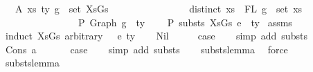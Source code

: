 \begin{isabellebody}
\ \ \ A{}{\isacharcolon}{\kern0pt}\ {\isachardoublequoteopen}{\isasymforall}{\isacharparenleft}{\kern0pt}{\isacharparenleft}{\kern0pt}xs{\isacharcomma}{\kern0pt}\ ty{\isacharparenright}{\kern0pt}{\isacharcomma}{\kern0pt}\ g{\isacharparenright}{\kern0pt}\ {\isasymin}\ set\ XsGs{\isachardot}{\kern0pt}\ {\isacharparenleft}{\kern0pt}\isanewline
\ \ \ \ \ \ \ \ \ \ \ \ \ \ \ distinct\ xs\ {\isasymand}\ FL\ g\ {\isacharequal}{\kern0pt}\ set\ xs\ {\isasymand}\isanewline
\ \ \ \ \ \ \ \ \ \ \ \ \ \ \ {\isacharbrackleft}{\kern0pt}{\isacharbrackright}{\kern0pt}\ {\isasymturnstile}{\isacharbraceleft}{\kern0pt}P{\isacharbraceright}{\kern0pt}\ Graph\ g\ {\isacharcolon}{\kern0pt}\ ty{\isacharparenright}{\kern0pt}{\isachardoublequoteclose}\isanewline
\ \ \ {\isachardoublequoteopen}{\isasymGamma}{}\ {\isasymturnstile}{\isacharbraceleft}{\kern0pt}P{\isacharbraceright}{\kern0pt}\ substs\ XsGs\ e{}\ {\isacharcolon}{\kern0pt}\ ty{}{\isachardoublequoteclose}\isanewline
%
\isadelimproof
%
\endisadelimproof
%
\isatagproof
{}\isamarkupfalse%
\ assms\isanewline
{}\isamarkupfalse%
\ {\isacharparenleft}{\kern0pt}induct\ XsGs\ arbitrary{\isacharcolon}{\kern0pt}\ {\isasymGamma}\ {\isasymGamma}{}\ e{}\ ty{}{\isacharparenright}{\kern0pt}\isanewline
\ \ \isamarkupfalse%
\ Nil\isanewline
\ \ \isamarkupfalse%
\ \isamarkupfalse%
\ {\isacharquery}{\kern0pt}case\isanewline
\ \ \isamarkupfalse%
\ {\isacharparenleft}{\kern0pt}simp\ add{\isacharcolon}{\kern0pt}\ substs{\isacharparenright}{\kern0pt}\isanewline
{}\isamarkupfalse%
\isanewline
\ \ \isamarkupfalse%
\ {\isacharparenleft}{\kern0pt}Cons\ a\ {\isasymGamma}{\isacharparenright}{\kern0pt}\isanewline
\ \ \isamarkupfalse%
\ \isamarkupfalse%
\ {\isacharquery}{\kern0pt}case\isanewline
\ \ \isamarkupfalse%
\ {\isacharparenleft}{\kern0pt}simp\ add{\isacharcolon}{\kern0pt}\ substs{\isacharparenright}{\kern0pt}\isanewline
\ \ \isamarkupfalse%
\ substs{\isacharunderscore}{\kern0pt}lemma{}\ \isamarkupfalse%
\ force\isanewline
{}\isamarkupfalse%
%
\endisatagproof
{\isafoldproof}%
%
\isadelimproof
\isanewline
%
\endisadelimproof
\isanewline
\isanewline
{}\isamarkupfalse%
\ substs{\isacharunderscore}{\kern0pt}lemma{\isacharcolon}{\kern0pt}\isanewline

\end{isabellebody}
